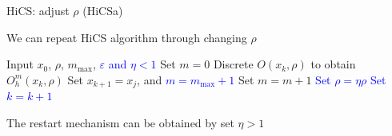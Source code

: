 \documentclass{beamer}
\begin{document}
\begin{frame}{HiCS: adjust $\rho$ (HiCSa)}

\begin{itemize}
\footnotesize{
	\item We can repeat HiCS algorithm through changing $\rho$
		}
\vspace{-0.2cm}
\begin{algorithm}[H]
\scriptsize{
	\caption{HiCS: adjust $\rho$}
	\label{alg:refined}
\begin{algorithmic}[1]
	\STATE Input $x_0$, $\rho$, $m_{\max}$,
	\textcolor{blue}{$\varepsilon$ and $\eta<1$}
	\IF { \textcolor{blue}{ $\rho>\varepsilon$}}
		\STATE Set $m=0$
			\STATE Discrete $O(x_k,\rho)$ to obtain $O^m_h(x_k,\rho)$
			\STATE Set $x_{k+1}=x_j$, 
				and \textcolor{blue}{$m=m_{\max}+1$} 
			\ELSE
				\STATE Set $m = m+1$
			\ENDIF
		\ELSE
			\STATE \textcolor{blue}{ Set $\rho=\eta\rho$}
		\ENDIF
		\STATE \textcolor{blue}{Set $k=k+1$}
	\ENDFOR
\ENDIF
\end{algorithmic}
}
\end{algorithm}
\pause
\vspace{-0.3cm}
\footnotesize{
	\item The restart mechanism can be obtained by set $\eta>1$
		}
\end{itemize}
\end{frame}
\end{document}
